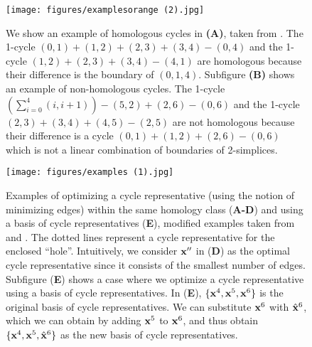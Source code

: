  \begin{figure}[h!]
\begin{center}
\DIFdelbeginFL %
\DIFdelendFL \DIFaddbeginFL \texttt{[image: figures/examplesorange (2).jpg]} 
\DIFaddendFL \end{center}
\caption{We show an example of homologous cycles in \textbf{(A)}, taken from \cite{TZH15}. The 1-cycle $(0,1) + (1,2) + (2,3) + (3,4) - (0,4)$ and the 1-cycle $(1,2) + (2,3) + (3,4) - (4,1)$ are homologous because their difference is the boundary of $(0,1,4)$. Subfigure \textbf{(B)} shows an example of non-homologous cycles. The 1-cycle $(\sum_{i=0}^4 (i, i+1))-(5,2)+(2,6)-(0,6)$ and the 1-cycle $(2,3) + (3,4)+(4,5)-(2,5)$ are not homologous because their difference is a cycle $(0,1)+(1,2)+(2,6)-(0,6)$ which is not a linear combination of boundaries of 2-simplices. } \label{fig:boundaryexample}
\end{figure}

\begin{figure}[h!]
\begin{center}
\DIFdelbeginFL %
\DIFdelendFL \DIFaddbeginFL \texttt{[image: figures/examples (1).jpg]} 
\DIFaddendFL \end{center}
\caption{Examples of optimizing a cycle representative (using the notion of minimizing edges) within the same homology class (\textbf{A-D}) and using a basis of cycle representatives (\textbf{E}), modified examples taken from \cite{Escolar2016} and \cite{Obayashi2018}. The dotted lines represent a cycle representative for the enclosed ``hole''. Intuitively, we consider $\mathbf{x}''$ in (\textbf{D}) as the optimal cycle representative since it consists of the smallest number of edges. Subfigure (\textbf{E}) shows a case where we optimize a cycle representative using a basis of cycle representatives. In (\textbf{E}), $\{\mathbf{x}^4, \mathbf{x}^5, \mathbf{x}^6\}$ is the original basis of cycle representatives. We can substitute $\mathbf{x}^6$ with $\hat{\mathbf{x}}^6$, which we can obtain by adding $\mathbf{x}^5$ to $\mathbf{x}^6$, and thus obtain $\{\mathbf{x}^4, \mathbf{x}^5, \hat{\mathbf{x}}^6\}$ as the new basis of cycle representatives.}\label{fig:example-optimal}
\end{figure}


